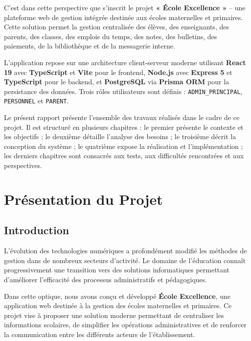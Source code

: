\documentclass[12pt, a4paper]{report}
\begin{document}
C'est dans cette perspective que s'inscrit le projet \textbf{« École Excellence »} -- une plateforme web de gestion intégrée destinée aux écoles maternelles et primaires. Cette solution permet la gestion centralisée des élèves, des enseignants, des parents, des classes, des emplois du temps, des notes, des bulletins, des paiements, de la bibliothèque et de la messagerie interne.

L'application repose sur une architecture client-serveur moderne utilisant \textbf{React 19} avec \textbf{TypeScript} et \textbf{Vite} pour le frontend, \textbf{Node.js} avec \textbf{Express 5} et \textbf{TypeScript} pour le backend, et \textbf{PostgreSQL} via \textbf{Prisma ORM} pour la persistance des données. Trois rôles utilisateurs sont définis : \texttt{ADMIN\_PRINCIPAL}, \texttt{PERSONNEL} et \texttt{PARENT}.

Le présent rapport présente l'ensemble des travaux réalisés dans le cadre de ce projet. Il est structuré en plusieurs chapitres : le premier présente le contexte et les objectifs ; le deuxième détaille l'analyse des besoins ; le troisième décrit la conception du système ; le quatrième expose la réalisation et l'implémentation ; les derniers chapitres sont consacrés aux tests, aux difficultés rencontrées et aux perspectives.

\chapter{Présentation du Projet}

\section{Introduction}
L'évolution des technologies numériques a profondément modifié les méthodes de gestion dans de nombreux secteurs d'activité. Le domaine de l'éducation connaît progressivement une transition vers des solutions informatiques permettant d'améliorer l'efficacité des processus administratifs et pédagogiques.

Dans cette optique, nous avons conçu et développé \textbf{École Excellence}, une application web destinée à la gestion des écoles maternelles et primaires. Ce projet vise à proposer une solution moderne permettant de centraliser les informations scolaires, de simplifier les opérations administratives et de renforcer la communication entre les différents acteurs de l'établissement.
\end{document}
